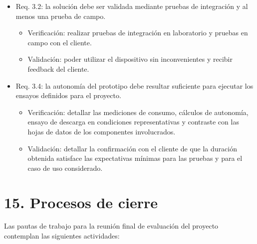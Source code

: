 \documentclass[
11pt, %
]{charter}
\begin{document}
\begin{itemize}
	\item Req. 3.2: la solución debe ser validada mediante pruebas de integración y al menos una prueba de campo.
	\begin{itemize}
		\item Verificación: realizar pruebas de integración en laboratorio y pruebas en campo con el cliente.
		\item Validación: poder utilizar el dispositivo sin inconvenientes y recibir feedback del cliente.
	\end{itemize}

	\item Req. 3.4: la autonomía del prototipo debe resultar suficiente para ejecutar los ensayos definidos para el proyecto.
	\begin{itemize}
		\item Verificación: detallar las mediciones de consumo, cálculos de autonomía, ensayo de descarga en condiciones representativas y contraste con las hojas de datos de los componentes involucrados.
		\item Validación: detallar la confirmación con el cliente de que la duración obtenida satisface las expectativas mínimas para las pruebas y para el caso de uso considerado.
	\end{itemize}
\end{itemize}


\section{15. Procesos de cierre}
\label{sec:cierre}

Las pautas de trabajo para la reunión final de evaluación del proyecto contemplan las siguientes actividades:
\end{document}

